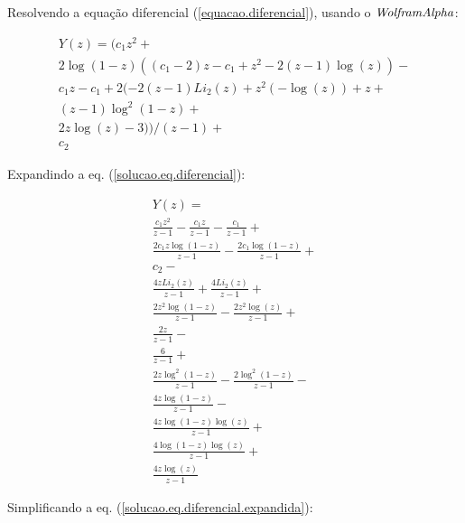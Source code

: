 \documentclass[a4paper,10pt]{article}
\begin{document}
Resolvendo a equação diferencial (\ref{equacao.diferencial}), usando o $\it{Wolfram Alpha}$:

\begin{equation}
\begin{array}{lcl} 
Y(z) = (c_1 z^2+ \\
2 \log(1-z) ((c_1-2) z-c_1+z^2-2 (z-1) \log(z))-\\
c_1 z-c_1+2 (-2 (z-1) Li_2(z)+z^2 (-\log(z))+z+\\
(z-1) \log^2(1-z)+\\
2 z \log(z)-3))/(z-1)+\\
c_2
\end{array}  
\label{solucao.eq.diferencial}
\end{equation}

Expandindo a eq. (\ref{solucao.eq.diferencial}):

\begin{equation}
\begin{array}{lcl} 
 Y(z) = \\
 \displaystyle \frac{c_1 z^2}{z-1}-\displaystyle \frac{c_1 z}{z-1}- \displaystyle \frac{c_1}{z-1}+\\
 \displaystyle \frac{2 c_1 z \log(1-z)}{z-1}-\displaystyle \frac{2 c_1 \log(1-z)}{z-1}+\\
 c_2-\\
 \displaystyle \frac{4 z Li_2(z)}{z-1}+\displaystyle \frac{4 Li_2(z)}{z-1}+\\
 \displaystyle \frac{2 z^2 \log(1-z)}{z-1}-\displaystyle \frac{2 z^2 \log(z)}{z-1}+\\
 \displaystyle \frac{2 z}{z-1}-\\
 \displaystyle \frac{6}{z-1}+\\
 \displaystyle \frac{2 z \log^2(1-z)}{z-1}-\displaystyle \frac{2 \log^2(1-z)}{z-1}-\\
 \displaystyle \frac{4 z \log(1-z)}{z-1}-\\
 \displaystyle \frac{4 z \log(1-z) \log(z)}{z-1}+\\
 \displaystyle \frac{4 \log(1-z) \log(z)}{z-1} + \\
  \displaystyle \frac{4 z \log(z)}{z-1}
\end{array}
\label{solucao.eq.diferencial.expandida}
\end{equation}

Simplificando a eq. (\ref{solucao.eq.diferencial.expandida}):
\end{document}

